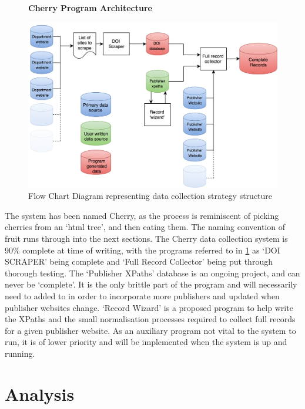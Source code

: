 \documentclass[11pt, oneside]{article}   	%
\begin{document}
\begin{figure}[H]
    \centering
    \textbf{Cherry Program Architecture}\par\medskip
    \includegraphics[scale=0.15]{CHERRY.png}
    \caption{Flow Chart Diagram representing data collection strategy structure \label{fig:CHERRY}}
\end{figure}
The system has been named Cherry, as the process is reminiscent of picking cherries from an `html tree', and then eating them. The naming convention of fruit runs through into the next sections. 
The Cherry data collection system is 90\% complete at time of writing, with the programs referred to in \ref{fig:CHERRY} as `DOI SCRAPER' being complete and `Full Record Collector' being put through thorough testing. The `Publisher XPaths' database is an ongoing project, and can never be `complete'. It is the only brittle part of the program and will necessarily need to added to in order to incorporate more publishers and updated when publisher websites change. 
`Record Wizard' is a proposed program to help write the XPaths and the small normalisation processes required to collect full records for a given publisher website. As an auxiliary program not vital to the system to run, it is of lower priority and will be implemented when the system is up and running.
\section{Analysis}
\label{sec:ANALYSIS}
\end{document}
